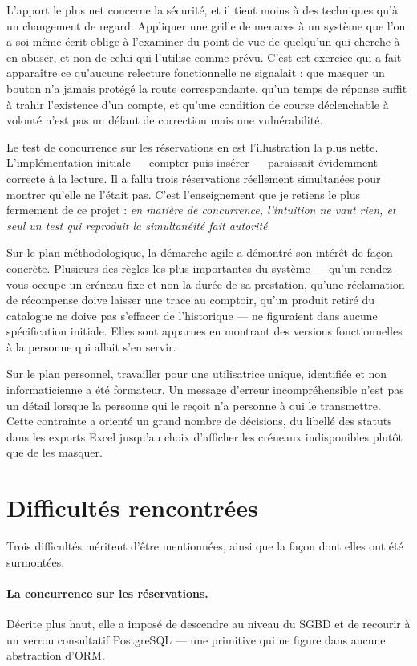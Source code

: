 L'apport le plus net concerne la sécurité, et il tient moins à des techniques
qu'à un changement de regard. Appliquer une grille de menaces à un système que
l'on a soi-même écrit oblige à l'examiner du point de vue de quelqu'un qui
cherche à en abuser, et non de celui qui l'utilise comme prévu. C'est cet
exercice qui a fait apparaître ce qu'aucune relecture fonctionnelle ne
signalait : que masquer un bouton n'a jamais protégé la route correspondante,
qu'un temps de réponse suffit à trahir l'existence d'un compte, et qu'une
condition de course déclenchable à volonté n'est pas un défaut de correction
mais une vulnérabilité.

Le test de concurrence sur les réservations en est l'illustration la plus
nette. L'implémentation initiale --- compter puis insérer --- paraissait
évidemment correcte à la lecture. Il a fallu trois réservations réellement
simultanées pour montrer qu'elle ne l'était pas. C'est l'enseignement que je
retiens le plus fermement de ce projet : \emph{en matière de concurrence,
l'intuition ne vaut rien, et seul un test qui reproduit la simultanéité fait
autorité}.

Sur le plan méthodologique, la démarche agile a démontré son intérêt de façon
concrète. Plusieurs des règles les plus importantes du système --- qu'un
rendez-vous occupe un créneau fixe et non la durée de sa prestation, qu'une
réclamation de récompense doive laisser une trace au comptoir, qu'un produit
retiré du catalogue ne doive pas s'effacer de l'historique --- ne figuraient
dans aucune spécification initiale. Elles sont apparues en montrant des
versions fonctionnelles à la personne qui allait s'en servir.

Sur le plan personnel, travailler pour une utilisatrice unique, identifiée et
non informaticienne a été formateur. Un message d'erreur incompréhensible n'est
pas un détail lorsque la personne qui le reçoit n'a personne à qui le
transmettre. Cette contrainte a orienté un grand nombre de décisions, du
libellé des statuts dans les exports Excel jusqu'au choix d'afficher les
créneaux indisponibles plutôt que de les masquer.

\section*{Difficultés rencontrées}

Trois difficultés méritent d'être mentionnées, ainsi que la façon dont elles
ont été surmontées.

\paragraph{La concurrence sur les réservations.} Décrite plus haut, elle a
imposé de descendre au niveau du SGBD et de recourir à un verrou consultatif
PostgreSQL --- une primitive qui ne figure dans aucune abstraction d'ORM.


